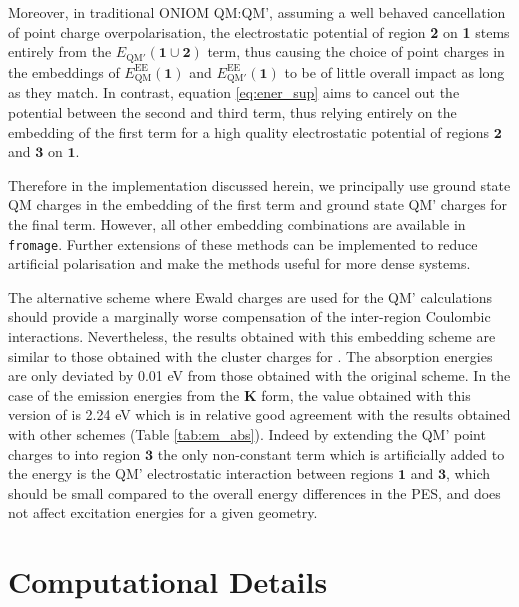 Moreover, in traditional ONIOM QM:QM', assuming a well behaved cancellation of point charge overpolarisation, the electrostatic potential of region \textbf{2} on \textbf{1} stems entirely from the $E_{\text{QM}'}(\bm{1} \cup \bm{2})$ term, thus causing the choice of point charges in the embeddings of $E_{\text{QM}}^{\text{EE}}(\bm{1})$ and $E_{\text{QM}'}^{\text{EE}}(\bm{1})$ to be of little overall impact as long as they match. In contrast, equation \ref{eq:ener_sup} aims to cancel out the potential between the second and third term, thus relying entirely on the embedding of the first term for a high quality electrostatic potential of regions $\bm{2}$ and $\bm{3}$ on $\bm{1}$.

Therefore in the implementation discussed herein, we principally use ground state QM charges in the embedding of the first term and ground state QM' charges for the final term. However, all other embedding combinations are available in \texttt{fromage}. Further extensions of these methods can be implemented to reduce artificial polarisation\cite{Biancardi2016} and make the methods useful for more dense systems.

The alternative scheme where Ewald charges are used for the QM' calculations should provide a marginally worse compensation of the inter-region Coulombic interactions. Nevertheless, the results obtained with this embedding scheme are similar to those obtained with the cluster charges for \HC{}. The absorption energies are only deviated by 0.01 eV from those obtained with the original scheme. In the case of the emission energies from the \textbf{K} form, the value obtained with this version of \EEC{} is 2.24 eV which is in relative good agreement with the results obtained with other schemes (Table \ref{tab:em_abs}). Indeed by extending the QM' point charges to into region $\bm{3}$ the only non-constant term which is artificially added to the energy is the QM' electrostatic interaction between regions $\bm{1}$ and $\bm{3}$, which should be small compared to the overall energy differences in the PES, and does not affect excitation energies for a given geometry.


\section{Computational Details}
\label{sec:comp}


